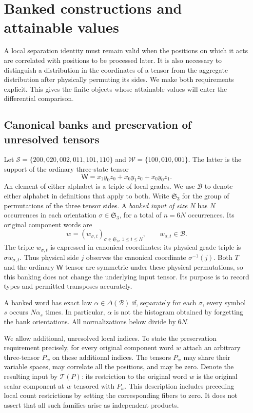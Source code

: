 \documentclass[11pt]{article}
\numberwithin{equation}{section}
\theoremstyle{definition}
\theoremstyle{remark}
\begin{document}
\section{Banked constructions and attainable values}
\label{val:section}

A local separation identity must remain valid when the positions on which it
acts are correlated with positions to be processed later.  It is also necessary
to distinguish a distribution in the coordinates of a tensor from the
aggregate distribution after physically permuting its sides.  We make both
requirements explicit.  This gives the finite objects whose attainable values
will enter the differential comparison.

\subsection{Canonical banks and preservation of unresolved tensors}
\label{val:banks}

Let $\mathcal S=\{200,020,002,011,101,110\}$ and
$\mathcal W=\{100,010,001\}$.  The latter is the support of the ordinary
three-state tensor
\[
 \mathsf W=x_1y_0z_0+x_0y_1z_0+x_0y_0z_1.
\]
An element of either alphabet is a triple of local grades.
We use $\mathcal B$ to denote either alphabet in definitions
that apply to both.  Write $\mathfrak S_3$ for the group of permutations of the
three tensor sides.  A \emph{banked input of size $N$} has $N$ occurrences in
each orientation $\sigma\in\mathfrak S_3$, for a total of $n=6N$
occurrences.  Its original component words are
\[
 w=(w_{\sigma,t})_{\sigma\in\mathfrak S_3,\ 1\le t\le N},
 \qquad w_{\sigma,t}\in\mathcal B.
\]
The triple $w_{\sigma,t}$ is expressed in canonical coordinates: its physical
grade triple is $\sigma w_{\sigma,t}$.  Thus physical side $j$ observes the
canonical coordinate $\sigma^{-1}(j)$.  Both $T$ and the ordinary $\mathsf W$ tensor
are symmetric under these physical permutations, so this banking does not
change the underlying input tensor.  Its purpose is to record types and
permitted transposes accurately.

A banked word has exact law $\alpha\in\Delta(\mathcal B)$ if, separately for
each $\sigma$, every symbol $s$ occurs $N\alpha_s$ times.  In particular,
$\alpha$ is not the histogram obtained by forgetting the bank orientations.
All normalizations below divide by $6N$.

We allow additional, unresolved local indices.  To state the preservation
requirement precisely, for every original component word $w$ attach an
arbitrary three-tensor $P_w$ on these additional indices.  The tensors $P_w$
may share their variable spaces, may correlate all the positions, and may be
zero.  Denote the resulting input by $\mathcal T(P)$: its restriction to the
original word $w$ is the original scalar component at $w$ tensored with
$P_w$.  This description includes preceding local count restrictions by
setting the corresponding fibers to zero.  It does not assert that all such
families arise as independent products.
\end{document}
